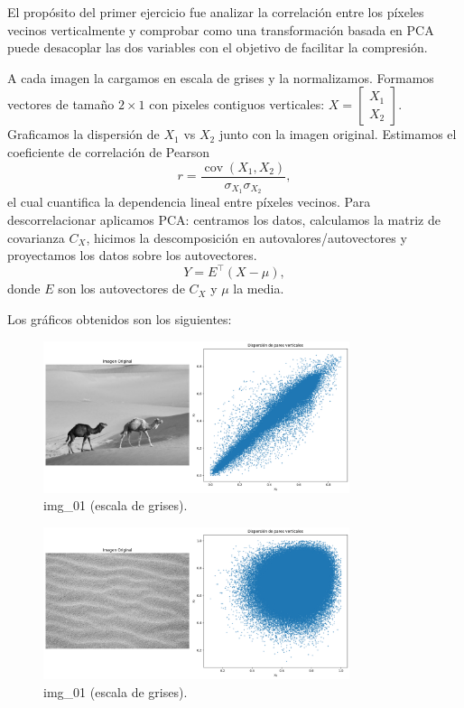 \documentclass[12pt, a4paper]{article}
\begin{document}
El propósito del primer ejercicio fue analizar la correlación entre los píxeles vecinos verticalmente y comprobar como una transformación basada en PCA puede desacoplar las dos variables con el objetivo de facilitar la compresión.

A cada imagen la cargamos en escala de grises y la normalizamos.
Formamos vectores de tamaño $2\times 1$ con pixeles contiguos verticales: \(X = \begin{bmatrix} X_1 \\ X_2 \end{bmatrix}\). 
Graficamos la dispersión de $X_1$ vs $X_2$ junto con la imagen original. Estimamos el coeficiente de correlación de Pearson
    \[
      r = \frac{\operatorname{cov}(X_1,X_2)}{\sigma_{X_1}\sigma_{X_2}},
    \]
el cual cuantifica la dependencia lineal entre píxeles vecinos.
Para descorrelacionar aplicamos PCA: centramos los datos, calculamos la matriz de covarianza $C_X$, hicimos la descomposición en autovalores/autovectores y proyectamos los datos sobre los autovectores.
    \[
      Y = E^\top (X - \mu),
    \]
donde $E$ son los autovectores de $C_X$ y $\mu$ la media.

Los gráficos obtenidos son los siguientes:

\begin{figure}[htbp]
  \centering
  \includegraphics[width=0.8\textwidth]{img1a1.png}
  \caption{img\_01 (escala de grises).}
  \label{fig:img01}
\end{figure}

\begin{figure}[htbp]
  \centering
  \includegraphics[width=0.8\textwidth]{img1a2.png}
  \caption{img\_01 (escala de grises).}
  \label{fig:img02}
\end{figure}
\end{document}
